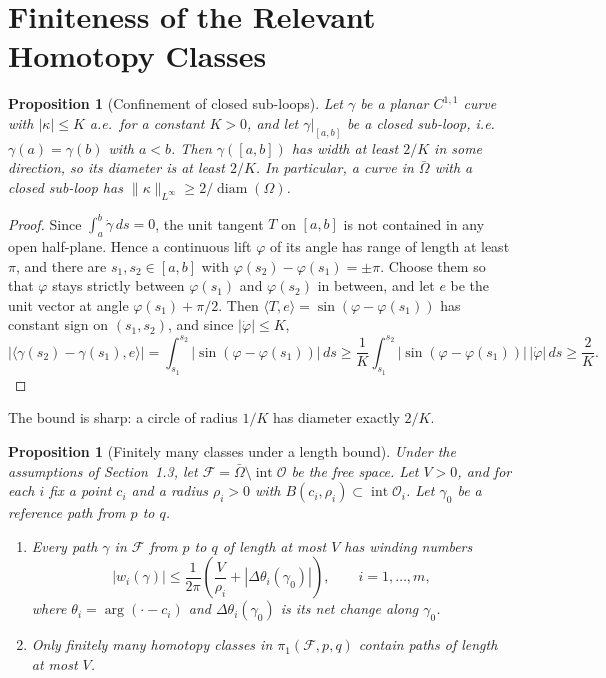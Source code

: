 \documentclass[11pt,reqno]{amsart}
\newtheorem{proposition}[theorem]{Proposition}
\theoremstyle{definition}
\numberwithin{equation}{section}
\begin{document}
\section{Finiteness of the Relevant Homotopy Classes}

\begin{proposition}[Confinement of closed sub-loops]
\label{prop:subloop}
Let $\gamma$ be a planar $C^{1,1}$ curve with $|\kappa| \le K$ a.e.\ for a constant $K > 0$, and let $\gamma|_{[a,b]}$ be a closed sub-loop, i.e.\ $\gamma(a) = \gamma(b)$ with $a < b$. Then $\gamma([a,b])$ has width at least $2/K$ in some direction, so its diameter is at least $2/K$. In particular, a curve in $\bar\Omega$ with a closed sub-loop has $\|\kappa\|_{L^\infty} \ge 2/\operatorname{diam}(\Omega)$.
\end{proposition}

\begin{proof}
Since $\int_a^b \dot\gamma\,ds = 0$, the unit tangent $T$ on $[a,b]$ is not contained in any open half-plane. Hence a continuous lift $\varphi$ of its angle has range of length at least $\pi$, and there are $s_1, s_2 \in [a,b]$ with $\varphi(s_2) - \varphi(s_1) = \pm\pi$. Choose them so that $\varphi$ stays strictly between $\varphi(s_1)$ and $\varphi(s_2)$ in between, and let $e$ be the unit vector at angle $\varphi(s_1) + \pi/2$. Then $\langle T, e\rangle = \sin(\varphi - \varphi(s_1))$ has constant sign on $(s_1, s_2)$, and since $|\dot\varphi| \le K$,
\begin{equation}
\big|\langle \gamma(s_2) - \gamma(s_1), e\rangle\big| = \int_{s_1}^{s_2} |\sin(\varphi - \varphi(s_1))|\,ds \ge \frac{1}{K}\int_{s_1}^{s_2} |\sin(\varphi - \varphi(s_1))|\,|\dot\varphi|\,ds \ge \frac{2}{K}.
\end{equation}
\end{proof}

The bound is sharp: a circle of radius $1/K$ has diameter exactly $2/K$.

\begin{proposition}[Finitely many classes under a length bound]
\label{thm:loop_bounding}
Under the assumptions of Section~1.3, let $\mathcal{F} = \bar\Omega \setminus \operatorname{int}\mathcal{O}$ be the free space. Let $V > 0$, and for each $i$ fix a point $c_i$ and a radius $\rho_i > 0$ with $B(c_i, \rho_i) \subset \operatorname{int}\mathcal{O}_i$. Let $\gamma_0$ be a reference path from $p$ to $q$.
\begin{enumerate}
    \item Every path $\gamma$ in $\mathcal{F}$ from $p$ to $q$ of length at most $V$ has winding numbers
    \begin{equation}
    |w_i(\gamma)| \le \frac{1}{2\pi}\left(\frac{V}{\rho_i} + |\Delta\theta_i(\gamma_0)|\right), \qquad i = 1, \dots, m,
    \end{equation}
    where $\theta_i = \arg(\cdot - c_i)$ and $\Delta\theta_i(\gamma_0)$ is its net change along $\gamma_0$.
    \item Only finitely many homotopy classes in $\pi_1(\mathcal{F}, p, q)$ contain paths of length at most $V$.
\end{enumerate}
\end{proposition}
\end{document}
